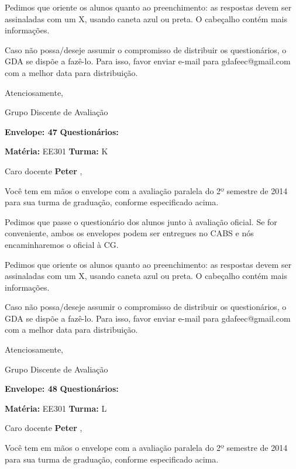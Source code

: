 \documentclass[a5paper]{letter}
\begin{document}
Pedimos que oriente os alunos quanto ao preenchimento: as respostas devem ser assinaladas com um X, usando caneta azul ou preta. O cabeçalho contém mais informações.

	Caso não possa/deseje assumir o compromisso de distribuir os questionários, o GDA se dispõe a fazê-lo. Para isso, favor enviar e-mail para gdafeec@gmail.com com a melhor data para distribuição.


Atenciosamente, 

Grupo Discente de Avaliação

\vspace{0.5cm}

{\bf Envelope: 47 }		\hfill	{\bf Questionários:} \hspace{2cm}

\newpage
\thispagestyle{empty}

\hfill {\bf Matéria:} EE301 {\bf Turma:} K

Caro docente {\bf Peter }, 

	Você tem em mãos o envelope com a avaliação paralela do 2º semestre de 2014 para sua turma de graduação, conforme especificado acima.

	Pedimos que passe o questionário dos alunos junto à avaliação oficial. Se for conveniente, ambos os envelopes podem ser entregues no CABS e nós encaminharemos o oficial à CG.

Pedimos que oriente os alunos quanto ao preenchimento: as respostas devem ser assinaladas com um X, usando caneta azul ou preta. O cabeçalho contém mais informações.

	Caso não possa/deseje assumir o compromisso de distribuir os questionários, o GDA se dispõe a fazê-lo. Para isso, favor enviar e-mail para gdafeec@gmail.com com a melhor data para distribuição.


Atenciosamente, 

Grupo Discente de Avaliação

\vspace{0.5cm}

{\bf Envelope: 48 }		\hfill	{\bf Questionários:} \hspace{2cm}

\newpage
\thispagestyle{empty}

\hfill {\bf Matéria:} EE301 {\bf Turma:} L

Caro docente {\bf Peter }, 

	Você tem em mãos o envelope com a avaliação paralela do 2º semestre de 2014 para sua turma de graduação, conforme especificado acima.
\end{document}
